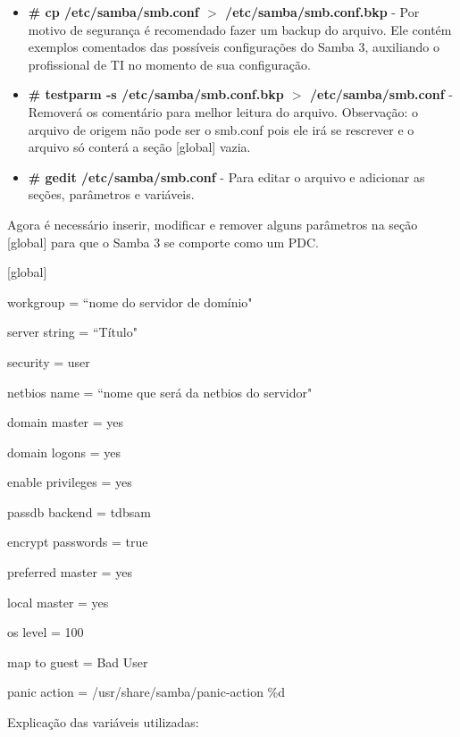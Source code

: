 \begin{itemize}
	\item \textbf{\# cp /etc/samba/smb.conf $>$ /etc/samba/smb.conf.bkp} - Por motivo de segurança é recomendado fazer um backup do arquivo. Ele contém exemplos comentados das possíveis configurações do Samba 3, auxiliando o profissional de TI no momento de sua configuração.
	\item \textbf{\# testparm -s /etc/samba/smb.conf.bkp $>$ /etc/samba/smb.conf} - Removerá os comentário para melhor leitura do arquivo. Observação: o arquivo de origem não pode ser o smb.conf pois ele irá se rescrever e o arquivo só conterá a seção [global] vazia.  
	\item \textbf{\# gedit /etc/samba/smb.conf} - Para editar o arquivo e adicionar as seções, parâmetros e variáveis.
\end{itemize}

Agora é necessário inserir, modificar e remover alguns parâmetros na seção [global] para que o Samba 3 se comporte como um PDC.
{\raggedright

[global] 

	workgroup = ``nome do servidor de domínio" 

	server string = ``Título"       

	security = user

	netbios name = ``nome que será da netbios do servidor"

	domain master = yes

	domain logons = yes

	enable privileges = yes

	passdb backend = tdbsam
	
	encrypt passwords = true

	preferred master = yes

	local master = yes

	os level = 100


	map to guest = Bad User

	panic action = /usr/share/samba/panic-action \%d
}

Explicação das variáveis utilizadas:

